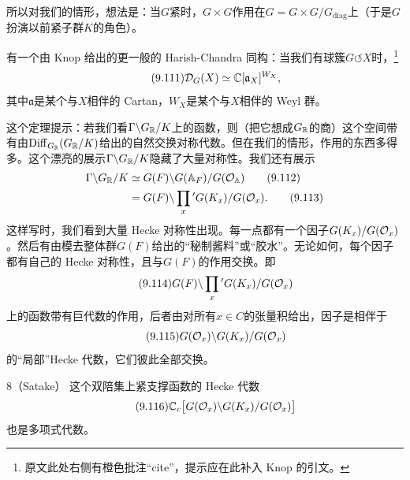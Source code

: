 所以对我们的情形，想法是：当$G$紧时，$G\times G$作用在$G=G\times G/G_{\mathrm{diag}}$上（于是$G$扮演以前紧子群$K$的角色）。

有一个由 Knop 给出的更一般的 Harish-Chandra 同构：当我们有球簇$G\circlearrowleft X$时，\footnote{原文此处右侧有橙色批注“cite”，提示应在此补入 Knop 的引文。}
\begin{equation}\tag{9.111}
\mathcal D_G(X)\simeq\mathbb{C}[\mathfrak a_X]^{W_X},
\end{equation}
其中$\mathfrak a$是某个与$X$相伴的 Cartan，$W_X$是某个与$X$相伴的 Weyl 群。

这个定理提示：若我们看$\Gamma\backslash G_{\mathbb{R}}/K$上的函数，则（把它想成$G_{\mathbb{R}}$的商）这个空间带有由$\mathrm{Diff}_{G_{\mathbb{R}}}(G_{\mathbb{R}}/K)$给出的自然交换对称代数。但在我们的情形，作用的东西多得多。这个漂亮的展示$\Gamma\backslash G_{\mathbb{R}}/K$隐藏了大量对称性。我们还有展示
\begin{align}
\Gamma\backslash G_{\mathbb{R}}/K&\simeq G(F)\backslash G(\mathbb{A}_F)/G(\mathcal{O}_{\mathbb{A}})\tag{9.112}\\
&=G(F)\backslash\prod_{x}{}^{\prime}G(K_x)/G(\mathcal{O}_x).\tag{9.113}
\end{align}
这样写时，我们看到大量 Hecke 对称性出现。每一点都有一个因子$G(K_x)/G(\mathcal{O}_x)$。然后有由模去整体群$G(F)$给出的“秘制酱料”或“胶水”。无论如何，每个因子都有自己的 Hecke 对称性，且与$G(F)$的作用交换。即
\begin{equation}\tag{9.114}
G(F)\backslash\prod_{x}{}^{\prime}G(K_x)/G(\mathcal{O}_x)
\end{equation}
上的函数带有巨代数的作用，后者由对所有$x\in C$的张量积给出，因子是相伴于
\begin{equation}\tag{9.115}
G(\mathcal{O}_x)\backslash G(K_x)/G(\mathcal{O}_x)
\end{equation}
的“局部”Hecke 代数，它们彼此全部交换。

\begin{srcthm}{8}（Satake）
这个双陪集上紧支撑函数的 Hecke 代数
\begin{equation}\tag{9.116}
\mathbb{C}_c\bigl[G(\mathcal{O}_x)\backslash G(K_x)/G(\mathcal{O}_x)\bigr]
\end{equation}
也是多项式代数。
\end{srcthm}


